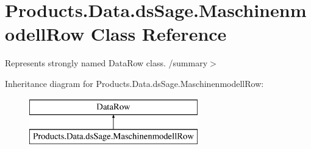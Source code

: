 \hypertarget{class_products_1_1_data_1_1ds_sage_1_1_maschinenmodell_row}{}\section{Products.\+Data.\+ds\+Sage.\+Maschinenmodell\+Row Class Reference}
\label{class_products_1_1_data_1_1ds_sage_1_1_maschinenmodell_row}


Represents strongly named Data\+Row class. /summary$>$  


Inheritance diagram for Products.\+Data.\+ds\+Sage.\+Maschinenmodell\+Row\+:\begin{figure}[H]
\begin{center}
\leavevmode
\includegraphics[height=2.000000cm]{class_products_1_1_data_1_1ds_sage_1_1_maschinenmodell_row}
\end{center}
\end{figure}
